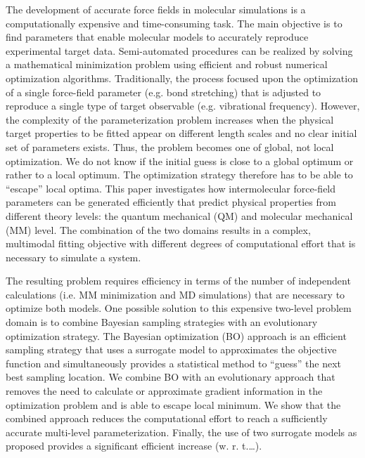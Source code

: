 \documentclass[preprint,12pt]{elsarticle}
\begin{document}
The development of accurate force fields in molecular simulations is a computationally expensive and time-consuming task. 
The main objective is to find parameters that enable molecular models to accurately reproduce experimental target data. 
Semi-automated procedures can be realized by solving a mathematical minimization problem using efficient and robust numerical optimization algorithms.
Traditionally, the process focused upon the optimization of a single force-field parameter (e.g. bond stretching) that is adjusted to reproduce a single type of target observable (e.g. vibrational frequency).
However, the complexity of the parameterization problem increases when the physical target properties to be fitted appear on different length scales and no clear initial set of parameters exists. 
Thus, the problem becomes one of global, not local optimization.
We do not know if the initial guess is close to a global optimum or rather to a local optimum.
The optimization strategy therefore has to be able to ``escape'' local optima.
This paper investigates how intermolecular force-field parameters can be generated efficiently that predict physical properties from different theory levels: the quantum mechanical (QM) and molecular mechanical (MM) level. 
The combination of the two domains results in a complex, multimodal fitting objective with different degrees of computational effort that is necessary to simulate a system.

The resulting problem requires efficiency in terms of the number of independent calculations (i.e. MM minimization and MD simulations) that are necessary to optimize both models. 
One possible solution to this expensive two-level problem domain is to combine Bayesian sampling strategies with an evolutionary optimization strategy.
The Bayesian optimization (BO) approach is an efficient sampling strategy that uses a surrogate model to approximates the objective function and simultaneously provides a statistical method to ``guess'' the next best sampling location.
We combine BO with an evolutionary approach that removes the need to calculate or approximate gradient information in the optimization problem and is able to escape local minimum.
We show that the combined approach reduces the computational effort to reach a sufficiently accurate multi-level parameterization.
Finally, the use of two surrogate models as proposed provides a significant efficient increase (w. r. t.\dots).
\end{document}
